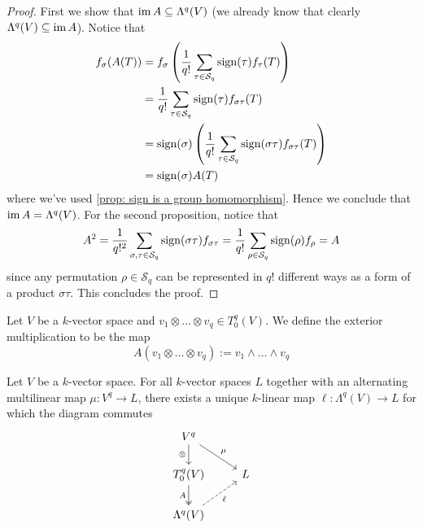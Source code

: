 \begin{proof}
  First we show that \(\operatorname{im} A \subseteq \Lambda^q(V)\) (we already know that
  clearly \(\Lambda^q(V) \subseteq \operatorname{im} A\)). Notice that
  \begin{align*}
    f_\sigma(A(T)) 
    &= f_\sigma \left( \frac 1 {q!} \sum_{\tau \in \mathcal S_q}
    \operatorname{sign}(\tau) f_\tau(T) \right) \\
    &= \frac 1 {q!} \sum_{\tau \in \mathcal S_q} \operatorname{sign}(\tau)
    f_{\sigma \tau}(T) \\
    &= \operatorname{sign}(\sigma) \left( \frac 1 {q!} \sum_{\tau \in \mathcal
    S_q} \operatorname{sign}(\sigma \tau) f_{\sigma \tau}(T) \right) \\
    &= \operatorname{sign}(\sigma) A(T)
  \end{align*}
  where we've used \cref{prop: sign is a group homomorphism}. Hence we conclude
  that \(\operatorname{im} A = \Lambda^q(V)\). For the second proposition, notice that
  \[
    A^2 = \frac 1 {q!^2} \sum_{\sigma, \tau \in \mathcal S_q}
    \operatorname{sign}(\sigma \tau) f_{\sigma \tau}
    = \frac 1 {q!} \sum_{\rho \in \mathcal S_q} \operatorname{sign}(\rho)
    f_\rho = A
  \]
  since any permutation \(\rho \in \mathcal S_q\) can be represented in \(q!\)
  different ways as a form of a product \(\sigma \tau\). This concludes the
  proof.
\end{proof}

\begin{definition}
  \label{def: exterior multiplication}
  Let \(V\) be a \(k\)-vector space and \(v_1 \otimes \dots \otimes v_q \in
  T_0^q(V)\). We define the exterior multiplication to be the map
  \[
    A(v_1 \otimes \dots \otimes v_q) := v_1 \wedge \dots \wedge v_q
  \] 
\end{definition}

\begin{proposition}
  \label{prop: exterior power universal property}
  Let \(V\) be a \(k\)-vector space. For all \(k\)-vector spaces \(L\) together
  with an alternating multilinear map \(\mu: V^q \to L\), there exists a unique
  \(k\)-linear map \(\ell: \Lambda^q(V) \to L\) for which the diagram commutes
  \[
    \begin{tikzcd}
      V^q \ar[d, swap, "\otimes"] \ar[dr, "\mu"] \\
      T_0^q(V) \ar[d, swap, two heads, "A"] &L \\
      \Lambda^q(V) \ar[ur, dashed, swap, "\ell"]
    \end{tikzcd}
  \] 
\end{proposition}

